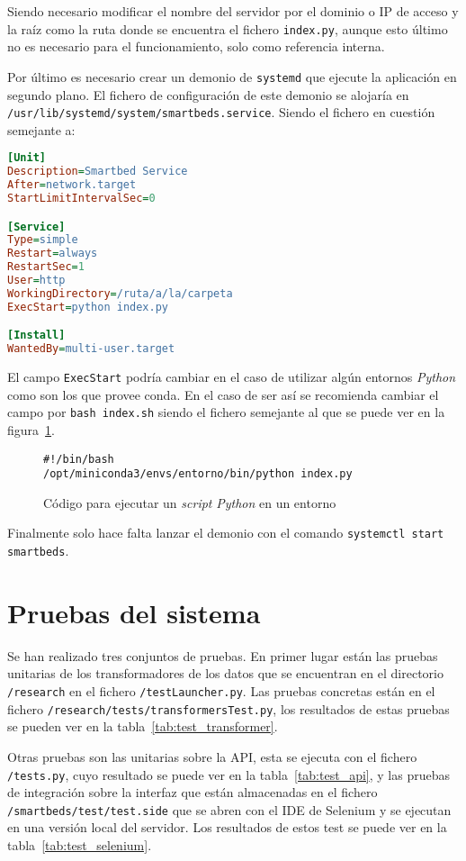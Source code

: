 Siendo necesario modificar el nombre del servidor por el dominio o IP de acceso y la raíz como la ruta donde se encuentra el fichero \texttt{index.py}, aunque esto último no es necesario para el funcionamiento, solo como referencia interna.

Por último es necesario crear un demonio de \texttt{systemd} que ejecute la aplicación en segundo plano. El fichero de configuración de este demonio se alojaría en \texttt{/usr/lib/systemd/system/smartbeds.service}. Siendo el fichero en cuestión semejante a:
\begin{lstlisting}[language={Ini}]
[Unit]
Description=Smartbed Service
After=network.target
StartLimitIntervalSec=0

[Service]
Type=simple
Restart=always
RestartSec=1
User=http
WorkingDirectory=/ruta/a/la/carpeta
ExecStart=python index.py

[Install]
WantedBy=multi-user.target
\end{lstlisting}

El campo \texttt{ExecStart} podría cambiar en el caso de utilizar algún entornos \textit{Python} como son los que provee conda. En el caso de ser así se recomienda cambiar el campo por \texttt{bash index.sh} siendo el fichero semejante al que se puede ver en la figura~\ref{fig:code-bash}.
\begin{figure}
	\begin{lstlisting}[language=bashb]
#!/bin/bash
/opt/miniconda3/envs/entorno/bin/python index.py
	\end{lstlisting}
	\caption{Código para ejecutar un \textit{script} \textit{Python} en un entorno}
	\label{fig:code-bash}
\end{figure}


Finalmente solo hace falta lanzar el demonio con el comando \texttt{systemctl start smartbeds}.

\section{Pruebas del sistema}

Se han realizado tres conjuntos de pruebas. En primer lugar están las pruebas unitarias de los transformadores de los datos que se encuentran en el directorio \texttt{/research} en el fichero \texttt{/testLauncher.py}. Las pruebas concretas están en el fichero \texttt{/research/tests/transformersTest.py}, los resultados de estas pruebas se pueden ver en la tabla~\ref{tab:test_transformer}.

Otras pruebas son las unitarias sobre la API, esta se ejecuta con el fichero \texttt{/tests.py}, cuyo resultado se puede ver en la tabla~\ref{tab:test_api}, y las pruebas de integración sobre la interfaz que están almacenadas en el fichero \texttt{/smartbeds/test/test.side} que se abren con el IDE de Selenium y se ejecutan en una versión local del servidor. Los resultados de estos test se puede ver en la tabla~\ref{tab:test_selenium}.

